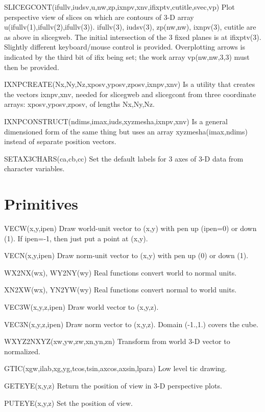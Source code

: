 \documentclass[12pt]{article}
\newif \iftth
\begin{document}
\iftth \special{html:<a href="slicetest.f"><img align="right"
src="sgcont.jpg" width="300"></a>}\fi

SLICEGCONT(ifullv,iudsv,u,nw,zp,ixnpv,xnv,ifixptv,cutitle,svec,vp) Plot
perspective view of slices on which are contours of 3-D array
u(ifullv(1),ifullv(2),ifullv(3)). ifullv(3), iudsv(3), zp(nw,nw),
ixnpv(3), cutitle are as above in slicegweb. The initial intersection
of the 3 fixed planes is at ifixptv(3). Slightly different
keyboard/mouse control is provided. Overplotting arrows is indicated
by the third bit of ifix being set; the work array vp(nw,nw,3,3)
must then be provided.

IXNPCREATE(Nx,Ny,Nz,xposv,yposv,zposv,ixnpv,xnv) Is a utility that
creates the vectors ixnpv,xnv, needed for slicegweb and slicegcont
from three coordinate arrays: xposv,yposv,zposv, of lengths Nx,Ny,Nz.

IXNPCONSTRUCT(ndims,imax,iuds,xyzmesha,ixnpv,xnv) Is a general
dimensioned form of the same thing but uses an array
xyzmesha(imax,ndims) instead of separate position vectors.

SETAX3CHARS(ca,cb,cc) Set the default labels for 3 axes of 3-D data
from character variables.

\section{Primitives}

VECW(x,y,ipen) Draw world-unit vector to (x,y) with pen up (ipen=0) or
down (1). If ipen=-1, then just put a point at (x,y).

VECN(x,y,ipen) Draw norm-unit vector to (x,y) with pen up (0) or down (1).

WX2NX(wx), WY2NY(wy) Real functions convert world to normal units.

XN2XW(wx), YN2YW(wy) Real functions convert normal to world units.

VEC3W(x,y,z,ipen) Draw world vector to (x,y,z).

VEC3N(x,y,z,ipen) Draw norm vector to (x,y,z). Domain (-1.,1.) covers
the cube.

WXYZ2NXYZ(xw,yw,zw,xn,yn,zn) Transform from world 3-D vector to
normalized.

GTIC(xgw,ilab,xg,yg,tcos,tsin,axcos,axsin,lpara) Low level tic drawing.

GETEYE(x,y,z) Return the position of view in 3-D perspective plots.

PUTEYE(x,y,z) Set the position of view.
\end{document}

